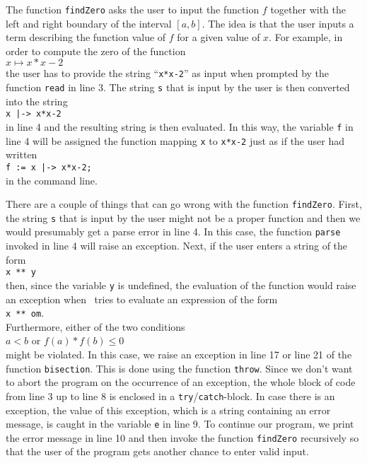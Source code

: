 The function \texttt{findZero} asks the user to input the function $f$ together with the left and
right boundary of the interval $[a,b]$.  The idea is that the user inputs a term describing the
function value of $f$ for a given value of $x$.  For example, in order to compute the zero of the
function
\\[0.2cm]
\hspace*{1.3cm}
$x \mapsto x*x - 2$
\\[0.2cm]
the user has to provide the string ``\texttt{x*x-2}'' as input when prompted by the function \texttt{read} in
line 3.  The string \texttt{s} that is input by the user is then converted into the string
\\[0.2cm]
\hspace*{1.3cm}
\texttt{x |-> x*x-2}
\\[0.2cm]
in line 4 and the resulting string is then evaluated.  In this way, the
variable \texttt{f} in line 4 will be assigned the function mapping \texttt{x} to \texttt{x*x-2}
just as if the user had written
\\[0.2cm]
\hspace*{1.3cm}
\texttt{f := x |-> x*x-2;}
\\[0.2cm]
in the command line.

 
There are a couple of things that can go wrong with the function \texttt{findZero}.  First,
the string \texttt{s} that is input by the user might not be a proper function and then
we would presumably get a parse error in line 4.  In this case, the function \texttt{parse}
invoked in line 4 will raise an exception. Next, if the user enters a string of the form
\\[0.2cm]
\hspace*{1.3cm}
\texttt{x ** y}
\\[0.2cm]
then, since the variable \texttt{y} is undefined, the evaluation of the function would
raise an exception when \setlx\ tries to evaluate an expression of the form
\\[0.2cm]
\hspace*{1.3cm}
\texttt{x ** om}.
\\[0.2cm]
Furthermore, either of the two conditions
\\[0.2cm]
\hspace*{1.3cm}
$a < b$ \quad or \quad $f(a) * f(b) \leq 0$
\\[0.2cm]
might be violated.  In this case, we raise an exception in line 17 or
line 21 of the function \texttt{bisection}.  This is done using the function \texttt{throw}.
Since we don't want to abort the program on the occurrence of an exception, the whole block of
code from line 3 up to line 8 is enclosed in a \texttt{try}/\texttt{catch}-block.  In case there is
an exception, the value of this exception, which is a string containing an error message, is
caught in the variable \texttt{e} in line 9.  To continue our program, we print the error message
in line 10 and then invoke the function \texttt{findZero} recursively so that the user of
the program gets another chance to enter valid input.

